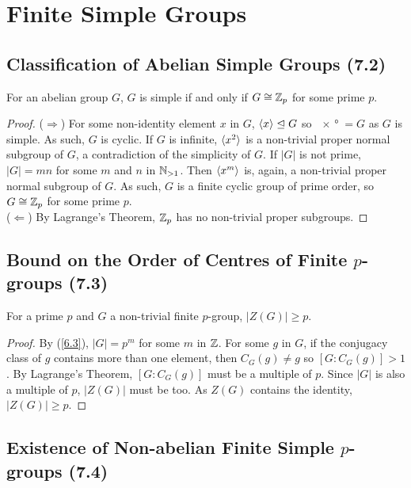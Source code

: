 \section{Finite Simple Groups}

\subsection{Classification of Abelian Simple Groups (7.2)} \label{7.2}

For an abelian group $G$, $G$ is simple if and only if 
$G \cong \mathbb{Z}_p$ for some prime $p$.

\begin{proof}
    ($\Longrightarrow$) For some non-identity element $x$ in $G$, ${\langle x \rangle} \trianglelefteq G$
    so $\ang{x} = G$ as $G$ is simple. As such, $G$ is cyclic.
    If $G$ is infinite, ${\langle x^2 \rangle}$ is a 
    non-trivial proper normal subgroup of
    $G$, a contradiction of the simplicity of $G$. If $|G|$
    is not prime, $|G| = mn$ for some $m$ and $n$ in $\mathbb{N}_{>1}$.
    Then ${\langle x^m \rangle}$ is, again, a non-trivial proper normal
    subgroup of $G$. As such, $G$ is a finite cyclic group
    of prime order, so $G \cong \mathbb{Z}_p$ for some prime $p$.
    \\[\baselineskip]
    ($\Longleftarrow$) By Lagrange's Theorem, $\mathbb{Z}_p$ has no
    non-trivial proper subgroups.
\end{proof}

\subsection{Bound on the Order of Centres of Finite $p$-groups (7.3)} \label{7.3}

For a prime $p$ and $G$ a non-trivial finite $p$-group,
$|Z(G)| \geq p$.

\begin{proof}
    By (\ref{6.3}), $|G| = p^m$ for some $m$ in $\mathbb{Z}$.
    For some $g$ in $G$, if the conjugacy class of $g$ contains
    more than one element, then $C_G(g) \neq g$ so 
    $[G : C_G(g)] > 1$. By Lagrange's Theorem, 
    $[G : C_G(g)]$ must be a multiple of $p$.
    Since $|G|$ is also a multiple of $p$, 
    $|Z(G)|$ must be too. As $Z(G)$ contains the
    identity, $|Z(G)| \geq p$.
\end{proof}

\subsection{Existence of Non-abelian Finite Simple $p$-groups (7.4)} \label{7.4}

